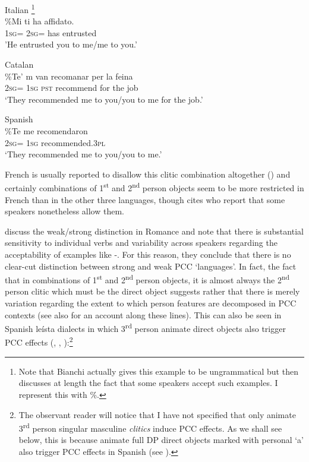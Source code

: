 \documentclass[output=paper,colorlinks,citecolor=brown,nonflat]{./langscibook}
\begin{document}
\ea%
    \label{ex:sheehan:5}
    Italian \citep[2027]{Bianchi2006}\footnote{Note that Bianchi actually gives this example to be ungrammatical but then discusses at length the fact that some speakers accept such examples. I represent this with \%.}\\
    \gll    \%Mi   ti     ha   affidato.\\
            \textsc{1sg=}   \textsc{2sg=}   has   entrusted\\
    \glt    'He entrusted you to me/me to you.’
\z

\ea%
    \label{ex:sheehan:6}
    Catalan \citep[179]{Bonet1991}\\
    \gll    \%Te’  m   van   recomanar   per   la   feina\\
            \textsc{2sg=}  \textsc{1sg}   \textsc{pst}   recommend  for   the   job\\
    \glt    ‘They recommended me to you/you to me for the job.’
\z

\ea%
    \label{ex:sheehan:7}
    Spanish \citep[61]{Perlmutter1971}\\
    \gll    \%Te   me   recomendaron\\
            \textsc{2sg=}  \textsc{1sg}   recommended.\textsc{3pl}\\
    \glt    ‘They recommended me to you/you to me.’
\z

French is usually reported to disallow this clitic combination altogether (\citealt{Kayne1975, Quicoli1984}) and certainly combinations of 1\textsuperscript{st} and 2\textsuperscript{nd} person objects seem to be more restricted in French than in the other three languages, though \citet[180]{Bonet1991} cites \citet{SimpsonWithgott1986} who report that some speakers nonetheless allow them. 

\citet{OrmazabalRomero2007} discuss the weak/strong distinction in Romance and note that there is substantial sensitivity to individual verbs and variability across speakers regarding the acceptability of examples like -. For this reason, they conclude that there is no clear-cut distinction between strong and weak PCC ‘languages’. In fact, the fact that in combinations of 1\textsuperscript{st} and 2\textsuperscript{nd} person objects, it is almost always the 2\textsuperscript{nd} person clitic which must be the direct object suggests rather that there is merely variation regarding the extent to which person features are decomposed in PCC contexts (see also \citealt{Anagnostopoulou2005} for an account along these lines). This can also be seen in Spanish leísta dialects in which 3\textsuperscript{rd} person animate direct objects also trigger PCC effects (\citealt{OrmazabalRomero2007}, \citeyear{OrmazabalRomero2010}, \citeyear{OrmazabalRomero2013Borealis}):\footnote{The observant reader will notice that I have not specified that only animate 3\textsuperscript{rd} person singular masculine \textit{clitics} induce PCC effects. As we shall see below, this is because animate full DP direct objects marked with personal ‘a’ also trigger PCC effects in Spanish (see \citealt{OrmazabalRomero2013Borealis}).} 
\end{document}

